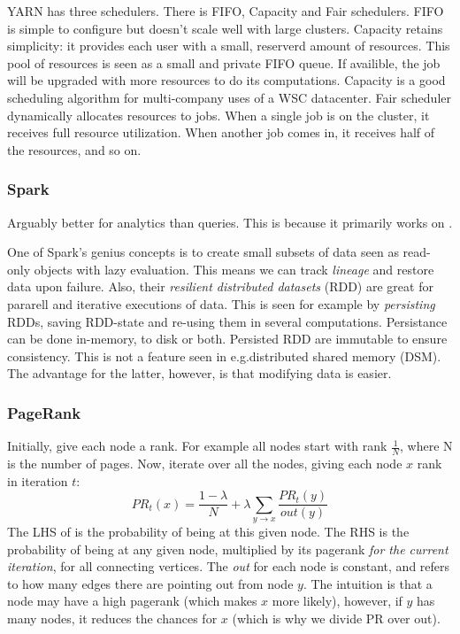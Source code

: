 YARN has three schedulers. There is FIFO, Capacity and Fair schedulers.
FIFO is simple to configure but doesn't scale well with large clusters.
Capacity retains simplicity: it provides each user with a small, reserverd amount of resources.
This pool of resources is seen as a small and private FIFO queue. If availible, the job will be upgraded
with more resources to do its computations. Capacity is a good scheduling algorithm for multi-company uses
of a WSC datacenter.  Fair scheduler dynamically allocates resources to jobs.
When a single job is on the cluster, it receives full resource utilization. When another job comes in,
it receives half of the resources, and so on.



\subsubsection{Spark}\label{sec:spark}
Arguably better for analytics than queries. This is because it primarily works on 
.

One of Spark's genius concepts is to create small subsets of data seen as read-only objects with lazy evaluation.
This means we can track \textit{lineage} and restore data upon failure. Also, their \textit{resilient distributed datasets} (RDD) are great for pararell and iterative executions of data.
This is seen for example by \textit{persisting} RDDs, saving RDD-state and re-using them in several computations.
Persistance can be done in-memory, to disk or both. Persisted RDD are immutable to ensure consistency.
This is not a feature seen in e.g.\@ distributed shared memory (DSM). The advantage for the latter, however,
is that modifying data is easier.

\subsubsection{PageRank}
Initially, give each node a rank. For example all nodes start with rank $\frac{1}{N}$, where N is the number of pages.
Now, iterate over all the nodes, giving each node $x$ rank in iteration $t$:
\begin{equation}\label{eq:pagerank}
    PR_{t}(x) = \frac{1 - \lambda}{N} + \lambda\sum\limits_{{y \rightarrow x}{}}{\frac{PR_{t}(y)}{out(y)}}
\end{equation}
The LHS of  is the probability of being at this given node. The RHS is the probability of being at any given node, multiplied by its pagerank \textit{for the current iteration}, for all connecting vertices. The \textit{out} for each node is constant, and refers to how many edges there are pointing out from node $y$. The intuition is that a node may have a high pagerank (which makes $x$ more likely), however, if $y$ has many nodes, it reduces the chances for $x$ (which is why we divide PR over out).

